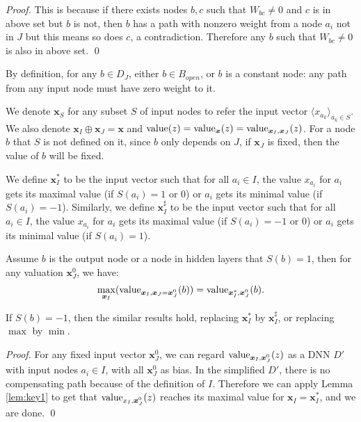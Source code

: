 			\begin{proof}
				This is because if there exists nodes $b,c$ such that $W_{bc}\neq 0$ and $c$ is in above set but $b$ is not, then $b$ has a path with nonzero weight from a node $a_i$ not in $J$ but this means so does $c$, a contradiction. Therefore any $b$ such that $W_{bc}\neq 0$ is also in above set. \qed
			\end{proof}
			
			By definition, for any $b\in D_J$, either $b\in B_{open}$, or $b$ is a constant node:  any path from any input node must have zero weight to it.
			
			We denote $\boldsymbol{x}_S$ for any subset $S$ of input nodes to refer the input vector $\langle x_{a_k}\rangle_{a_k\in S}$. We also denote $\boldsymbol{x}_I\oplus \boldsymbol{x}_J = \boldsymbol{x}$ and ${\textrm{value}}(z)={\textrm{value}}_{\boldsymbol{x}}(z)={\textrm{value}}_{\boldsymbol{x}_I,\boldsymbol{x}_J} (z)$. For a node $b$ that $S$ is not defined on it, since $b$ only depends on $J$, if $\boldsymbol{x}_J$ is fixed, then the value of $b$ will be fixed.
			
			We define $\boldsymbol{x}_I^*$ to be the input vector such that for all $a_i \in I$, the value $x_{a_i}$ for $a_i$ gets its maximal value (if $S(a_i)=1$ or $0$) or $a_i$ gets its minimal value (if $S(a_i)=-1$). Similarly, we define $\boldsymbol{x}_I^\sharp$ to be the input vector such that for all $a_i \in I$, the value $x_{a_i}$ for $a_i$ gets its maximal value (if $S(a_i)=-1$ or $0$) or $a_i$ gets its minimal value (if $S(a_i)=1$).
			
			
			
			\begin{lemma} \label{lem:reach_max_2}
				
				Assume $b$ is the output node or a node in hidden layers that $S(b)=1$, then   for any valuation $\boldsymbol{x}^0_J$, 
				we have: $$\max_{\boldsymbol{x}_I} ({\textrm{value}}_{\boldsymbol{x}_I,\boldsymbol{x}_J=\boldsymbol{x}^0_J}(b)) =  {\textrm{value}}_{\boldsymbol{x}_I^*,\boldsymbol{x}^0_J}(b).$$
				
				
				
				
				
				If $S(b)=-1$, then the similar results hold, replacing $\boldsymbol{x}^*_I$ by $\boldsymbol{x}^\sharp_I$, or replacing $\max$ by $\min$. 
			\end{lemma}
			
			\begin{proof}
				
				
				For any fixed input vector $\boldsymbol{x}^0_J$, we can regard ${\textrm{value}}_{\boldsymbol{x}_I,\boldsymbol{x}^0_J}(z)$ as a DNN $D'$ with input nodes $a_i\in I$, with all $\boldsymbol{x}^0_J$ %
				as bias. In the simplified $D'$, there is no compensating path because of the definition of $I$. Therefore we can apply Lemma \ref{lem:key1} to get that ${\textrm{value}}_{x_I,\boldsymbol{x}^0_J}(z)$ reaches its maximal value for $\boldsymbol{x}_I=\boldsymbol{x}_I^*$, and we are done. \qed
			\end{proof}
			
